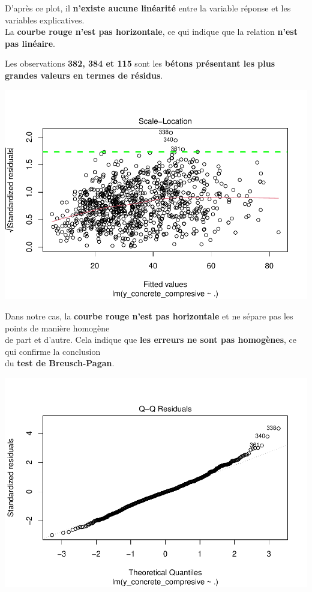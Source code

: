 \documentclass[
  12pt,
]{article}
\begin{document}
D'après ce plot, il \textbf{n'existe aucune linéarité} entre la variable
réponse et les variables explicatives.\\
La \textbf{courbe rouge n'est pas horizontale}, ce qui indique que la
relation \textbf{n'est pas linéaire}.

Les observations \textbf{382, 384 et 115} sont les \textbf{bétons
présentant les plus grandes valeurs en termes de résidus}.

\includegraphics{rmd_final_files/figure-latex/unnamed-chunk-43-1.pdf}

Dans notre cas, la \textbf{courbe rouge n'est pas horizontale} et ne
sépare pas les points de manière homogène\\
de part et d'autre. Cela indique que \textbf{les erreurs ne sont pas
homogènes}, ce qui confirme la conclusion\\
du \textbf{test de Breusch-Pagan}.

\includegraphics{rmd_final_files/figure-latex/unnamed-chunk-44-1.pdf}
\end{document}
